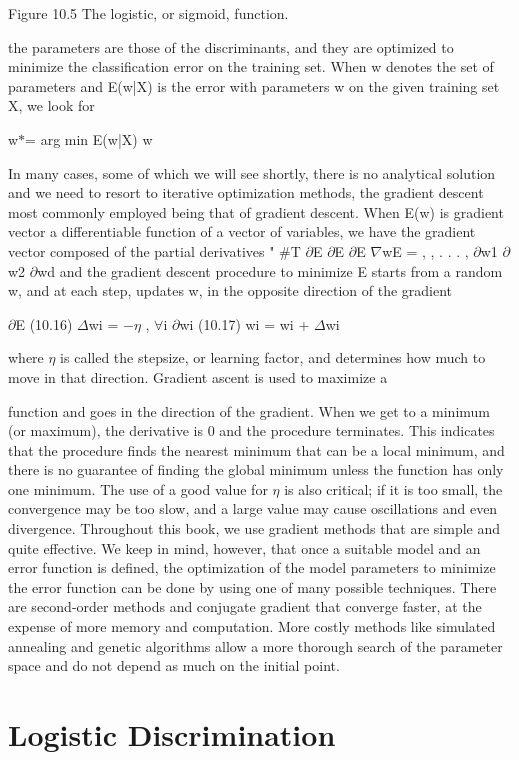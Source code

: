 Figure 10.5 The logistic, or sigmoid, function.

the parameters are those of the discriminants, and they are optimized to minimize the classification error on the training set. When w denotes the set of parameters and E(w|X) is the error with parameters w on the given training set X, we look for

w$*$= arg min E(w|X) w

In many cases, some of which we will see shortly, there is no analytical solution and we need to resort to iterative optimization methods, the gradient descent most commonly employed being that of gradient descent. When E(w) is gradient vector a differentiable function of a vector of variables, we have the gradient vector composed of the partial derivatives " \#T $\partial$E $\partial$E $\partial$E $\nabla$wE = , , . . . , $\partial$w1 $\partial$w2 $\partial$wd and the gradient descent procedure to minimize E starts from a random w, and at each step, updates w, in the opposite direction of the gradient

$\partial$E (10.16) $\Delta$wi = $-$$\eta$ , $\forall$i $\partial$wi (10.17) wi = wi + $\Delta$wi

where $\eta$ is called the stepsize, or learning factor, and determines how much to move in that direction. Gradient ascent is used to maximize a

function and goes in the direction of the gradient. When we get to a minimum (or maximum), the derivative is 0 and the procedure terminates. This indicates that the procedure finds the nearest minimum that can be a local minimum, and there is no guarantee of finding the global minimum unless the function has only one minimum. The use of a good value for $\eta$ is also critical; if it is too small, the convergence may be too slow, and a large value may cause oscillations and even divergence. Throughout this book, we use gradient methods that are simple and quite effective. We keep in mind, however, that once a suitable model and an error function is defined, the optimization of the model parameters to minimize the error function can be done by using one of many possible techniques. There are second-order methods and conjugate gradient that converge faster, at the expense of more memory and computation. More costly methods like simulated annealing and genetic algorithms allow a more thorough search of the parameter space and do not depend as much on the initial point.

\section{Logistic Discrimination}

